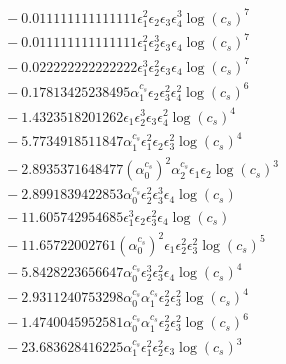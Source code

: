 \documentclass[10pt]{article}
\begin{document}
\begin{align*}
&{}  - 0.011111111111111 \epsilon_{1}^{2} \epsilon_{2} \epsilon_{3} \epsilon_{4}^{3} \log{\left(c_{s} \right)}^{7} \\
&{}  - 0.011111111111111 \epsilon_{1}^{2} \epsilon_{2}^{3} \epsilon_{3} \epsilon_{4} \log{\left(c_{s} \right)}^{7} \\
&{}  - 0.022222222222222 \epsilon_{1}^{3} \epsilon_{2}^{2} \epsilon_{3} \epsilon_{4} \log{\left(c_{s} \right)}^{7} \\
&{}  - 0.17813425238495 \alpha_{1}^{c_s} \epsilon_{2} \epsilon_{3}^{2} \epsilon_{4}^{2} \log{\left(c_{s} \right)}^{6} \\
&{}  - 1.4323518201262 \epsilon_{1} \epsilon_{2}^{3} \epsilon_{3} \epsilon_{4}^{2} \log{\left(c_{s} \right)}^{4} \\
&{}  - 5.7734918511847 \alpha_{1}^{c_s} \epsilon_{1}^{2} \epsilon_{2} \epsilon_{3}^{2} \log{\left(c_{s} \right)}^{4} \\
&{}  - 2.8935371648477 \left(\alpha_{0}^{c_s}\right)^{2} \alpha_{2}^{c_s} \epsilon_{1} \epsilon_{2} \log{\left(c_{s} \right)}^{3} \\
&{}  - 2.8991839422853 \alpha_{0}^{c_s} \epsilon_{2}^{2} \epsilon_{3}^{3} \epsilon_{4} \log{\left(c_{s} \right)} \\
&{}  - 11.605742954685 \epsilon_{1}^{3} \epsilon_{2} \epsilon_{3}^{2} \epsilon_{4} \log{\left(c_{s} \right)} \\
&{}  - 11.65722002761 \left(\alpha_{0}^{c_s}\right)^{2} \epsilon_{1} \epsilon_{2}^{2} \epsilon_{3}^{2} \log{\left(c_{s} \right)}^{5} \\
&{}  - 5.8428223656647 \alpha_{0}^{c_s} \epsilon_{2}^{3} \epsilon_{3}^{2} \epsilon_{4} \log{\left(c_{s} \right)}^{4} \\
&{}  - 2.9311240753298 \alpha_{0}^{c_s} \alpha_{1}^{c_s} \epsilon_{2}^{2} \epsilon_{3}^{2} \log{\left(c_{s} \right)}^{4} \\
&{}  - 1.4740045952581 \alpha_{0}^{c_s} \alpha_{1}^{c_s} \epsilon_{2}^{2} \epsilon_{3}^{2} \log{\left(c_{s} \right)}^{6} \\
&{}  - 23.683628416225 \alpha_{1}^{c_s} \epsilon_{1}^{2} \epsilon_{2}^{2} \epsilon_{3} \log{\left(c_{s} \right)}^{3}
\end{align*}
\end{document}
